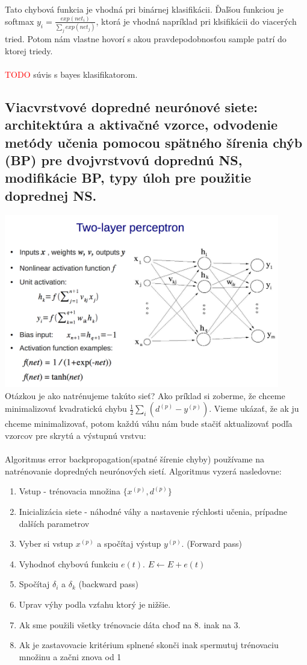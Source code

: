 \documentclass{article}
\numberwithin{equation}{section} %
\begin{document}
Tato chybová funkcia je vhodná pri binárnej klasifikácii. Ďaľšou funkciou je softmax $y_i = \frac{exp(net_i)}{\sum_j exp(net_j)}$, ktorá je vhodná napríklad pri klsifikácii do viacerých tried. Potom nám vlastne hovorí s akou pravdepodobnosťou sample patrí do ktorej triedy.
\\\\ \textcolor{red}{TODO} súvis s bayes klasifikatorom.

\subsection{Viacvrstvové dopredné neurónové siete: architektúra a aktivačné vzorce, odvodenie metódy učenia pomocou spätného šírenia chýb (BP) pre dvojvrstvovú doprednú NS, modifikácie BP, typy úloh pre použitie doprednej NS.}
\includegraphics[width=12cm]{imgs/2Lmlp}\\
Otázkou je ako natrénujeme takúto sieť? Ako príklad si zoberme, že chceme minimalizovať kvadratickú chybu $\frac{1}{2}\sum_i(d^{(p)} - y^{(p)})$. Vieme ukázať, že ak ju chceme minimalizovať, potom každú váhu nám bude stačiť aktualizovať podľa vzorcov pre skrytú a výstupnú vrstvu:
\\\\
Algoritmus error backpropagation(spatné šírenie chyby) používame na natrénovanie dopredných neurónových sietí. Algoritmus vyzerá nasledovne:\\
\begin{enumerate}
\item Vstup - trénovacia množina $\{x^{(p)}, d^{(p)}\}$
\item Inicializácia siete - náhodné váhy a nastavenie rýchlosti učenia, prípadne dalších parametrov
\item Vyber si vstup $x^{(p)}$ a spočítaj výstup $y^{(p)}$. (Forward pass)
\item Vyhodnoť chybovú funkciu $e(t)$.  $E \leftarrow E + e(t)$
\item Spočítaj $\delta_i$ a $\delta_k$ (backward pass)
\item Uprav výhy podla vzťahu ktorý je nižšie.
\item Ak sme použili všetky trénovacie dáta choď na 8. inak na 3.
\item Ak je zastavovacie kritérium splnené	skonči inak spermutuj trénovaciu množinu a začni znova od 1
\end{enumerate}
\end{document}
